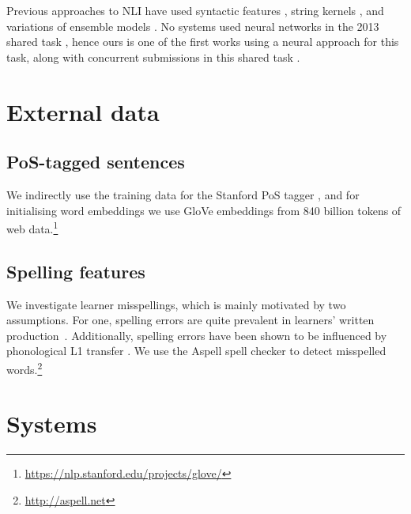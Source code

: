 \documentclass[11pt,letterpaper]{article}
\begin{document}
Previous approaches to NLI have used syntactic features \citep{bykh:2014}, string kernels \citep{ionescu:2014}, and variations of ensemble models \citep{malmasi:2017:nlisg,nli2013}.
No systems used neural networks in the 2013 shared task \citep{nli2013}, hence ours is one of the first works using a neural approach for this task, along with concurrent submissions in this shared task \citep{nli2017}.

\section{External data}

\subsection{PoS-tagged sentences}
We indirectly use the training data for the Stanford PoS tagger
\citep{Manning2014corenlp}, and for initialising word embeddings we use
GloVe embeddings from 840 billion tokens of web data.\footnote{\url{https://nlp.stanford.edu/projects/glove/}}

\subsection{Spelling features}
We investigate learner misspellings, which is mainly motivated by two assumptions.
For one, spelling errors are quite prevalent in learners' written production~\cite{kochmar2011}.
Additionally, spelling errors have been shown to be influenced by phonological L1 transfer \citep{grigonyte2014pronunciation}.
We use the Aspell spell checker to detect misspelled words.\footnote{\url{http://aspell.net}}

\section{Systems}
\end{document}
